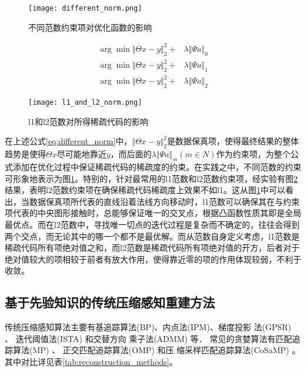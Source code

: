 \begin{figure}[ht]
  \centering
  \texttt{[image: different\_norm.png]}
  \caption{不同范数约束项对优化函数的影响}
  \label{fig:different_norm_fig}
\end{figure}

\begin{equation}
    \begin{aligned}
      \arg\min \Vert \Theta x - y \Vert_2^2 +& \lambda \Vert \Psi a \Vert_0  \\
      \arg\min \Vert \Theta x - y \Vert_2^2 +& \lambda \Vert \Psi a \Vert_1  \\
      \arg\min \Vert \Theta x - y \Vert_2^2 +& \lambda \Vert \Psi a \Vert_2 
    \end{aligned}
    \label{eq:different_norm}
\end{equation}

\begin{figure}[ht]
  \centering
  \texttt{[image: l1\_and\_l2\_norm.png]}
  \caption{l1和l2范数对所得稀疏代码的影响}
  \label{fig:l1_and_l2_norm}
\end{figure}
在上述公式\ref{eq:different_norm}中，$\Vert \Theta x - y \Vert_2^2$是数据保真项，使得最终结果的整体趋势是使得$\Theta x$尽可能地靠近$y$，而后面的$\lambda \Vert \Psi a \Vert_m(m\in N)$作为约束项，为整个公式添加在优化过程中保证稀疏代码的稀疏度的约束。在实践之中，不同范数的约束可形象地表示为图\ref{fig:different_norm_fig}。特别的，针对最常用的l1范数和l2范数约束项，经实验有图\ref{fig:l1_and_l2_norm}结果，表明l2范数约束项在确保稀疏代码稀疏度上效果不如l1。这从图\ref{fig:different_norm_fig}中可以看出，当数据保真项所代表的直线沿着法线方向移动时，l1范数可以确保其在与约束项代表的中央图形接触时，总能够保证唯一的交叉点，根据凸函数性质其即是全局最优点。而在l2范数中，寻找唯一切点的迭代过程是复杂而不确定的，往往会得到两个交点，而无论其中的哪一个都不是最优解。而从范数自身定义考虑，l1范数是稀疏代码所有项绝对值之和，而l2范数是稀疏代码所有项绝对值的开方，后者对于绝对值较大的项相较于前者有放大作用，使得靠近零的项的作用体现较弱，不利于收敛。

\subsection{基于先验知识的传统压缩感知重建方法}

传统压缩感知算法主要有基追踪算法(BP)、内点法(IPM)、梯度投影
法(GPSR)  、 迭代阈值法(ISTA) 和交替方向
乘子法(ADMM)  等． 常见的贪婪算法有匹配追
踪算法(MP) 、 正交匹配追踪算法(OMP)  和压
缩采样匹配追踪算法(CoSaMP) 。其中对比详见表\ref{tab:reconstruction_methods}。


